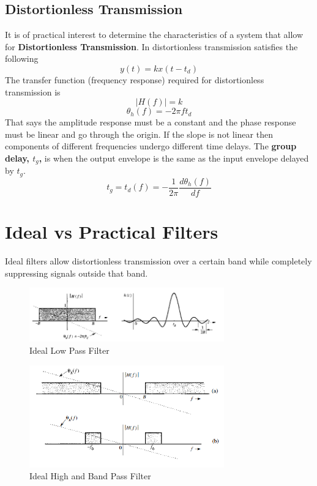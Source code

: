 \documentclass{article}
\begin{document}
    \subsection{Distortionless Transmission}
    It is of practical interest to determine the characteristics of a system that allow for \textbf{Distortionless Transmission}. In distortionless transmission
    satisfies the following
    \begin{equation}
        y(t) = kx(t-t_d)
    \end{equation}
    The transfer function (frequency response) required for distortionless transmission is
    \begin{equation}
        |H(f)| = k
    \end{equation}
    \begin{equation}
        \theta_h(f) = -2\pi ft_d
    \end{equation}
    That says the amplitude response must be a constant and the phase response must be linear and go through the origin. If the slope is not linear
    then components of different frequencies undergo different time delays. The \textbf{group delay, $t_g$,} is when the output envelope is the same as the input
    envelope delayed by $t_g$.
    \begin{equation}
        t_g = t_d(f) = -\frac{1}{2\pi}\frac{d\theta_h(f)}{df}
    \end{equation}

    \section{Ideal vs Practical Filters}
    Ideal filters allow distortionless transmission over a certain band while completely suppressing signals outside that band.

    \begin{figure}[h]
        \centering
        \includegraphics[width=0.75\textwidth]{lp}
        \caption{Ideal Low Pass Filter}
    \end{figure}

    \begin{figure}[h]
        \centering
        \includegraphics[width=0.75\textwidth]{hp_bp}
        \caption{Ideal High and Band Pass Filter}
    \end{figure}
\end{document}
